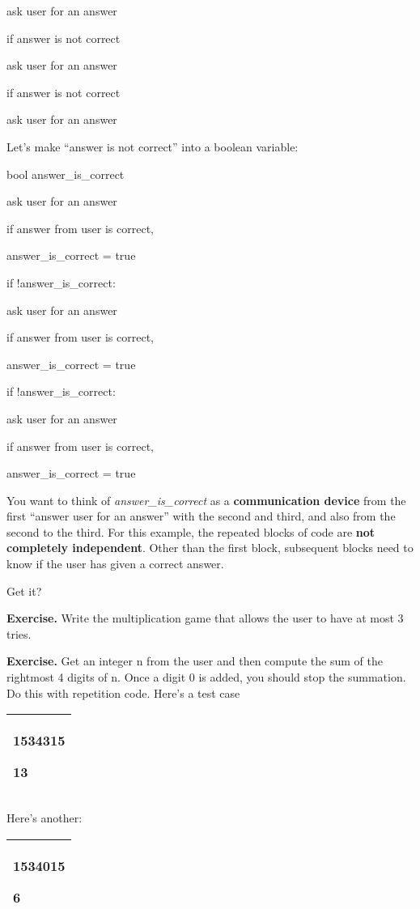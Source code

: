 \documentclass[
]{article}
\begin{document}
ask user for an answer

if answer is not correct

ask user for an answer

if answer is not correct

ask user for an answer

Let's make ``answer is not correct'' into a boolean variable:

bool answer\_is\_correct

ask user for an answer

if answer from user is correct,

answer\_is\_correct = true

if !answer\_is\_correct:

ask user for an answer

if answer from user is correct,

answer\_is\_correct = true

if !answer\_is\_correct:

ask user for an answer

if answer from user is correct,

answer\_is\_correct = true

You want to think of \emph{answer\_is\_correct} as a
\textbf{communication device} from the first ``answer user for an
answer'' with the second and third, and also from the second to the
third. For this example, the repeated blocks of code are \textbf{not
completely independent}. Other than the first block, subsequent blocks
need to know if the user has given a correct answer.

Get it?

\textbf{Exercise.} Write the multiplication game that allows the user to
have at most 3 tries.

\textbf{Exercise.} Get an integer n from the user and then compute the
sum of the rightmost 4 digits of n. Once a digit 0 is added, you should
stop the summation. Do this with repetition code. Here's a test case

\begin{longtable}[]{@{}l@{}}
\toprule
\endhead
\begin{minipage}[t]{0.97\columnwidth}\raggedright
\textbf{1534315}

13\strut
\end{minipage}\tabularnewline
\bottomrule
\end{longtable}

Here's another:

\begin{longtable}[]{@{}l@{}}
\toprule
\endhead
\begin{minipage}[t]{0.97\columnwidth}\raggedright
\textbf{1534015}

6\strut
\end{minipage}\tabularnewline
\bottomrule
\end{longtable}
\end{document}
